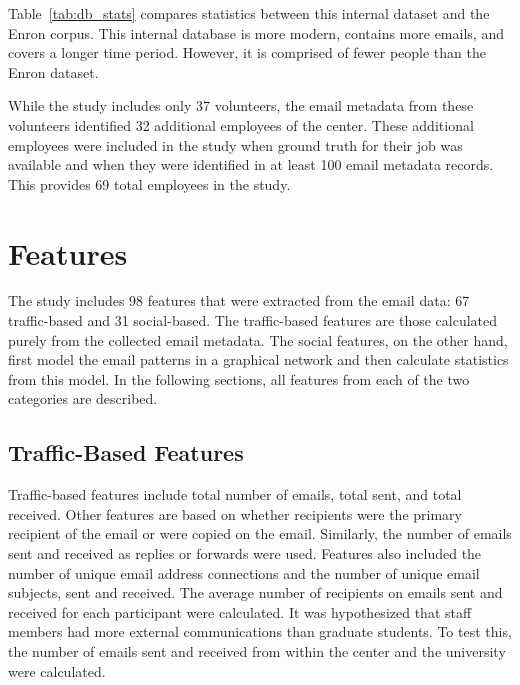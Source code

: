 \documentclass[10pt,twocolumn,conference]{IEEEtran}
\begin{document}
\begin{table}[t]
\centering
\caption{A comparison between the internal dataset and the Enron email corpus.}
\label{tab:db_stats}
\end{table}


Table~\ref{tab:db_stats} compares statistics between this internal dataset and the Enron corpus.  This internal database is more modern, contains more emails, and covers a longer time period.  However, it is comprised of fewer people than the Enron dataset.

While the study includes only 37 volunteers, the email metadata from these volunteers identified 32 additional employees of the center.  These additional employees were included in the study when ground truth for their job was available and when they were identified in at least 100 email metadata records.  This provides 69 total employees in the study.


\section{Features} \label{Features}
The study includes 98 features that were extracted from the email data: 67 traffic-based and 31 social-based.  The traffic-based features are those calculated purely from the collected email metadata.  The social features, on the other hand, first model the email patterns in a graphical network and then calculate statistics from this model.  In the following sections, all features from each of the two categories are described. 

\subsection{Traffic-Based Features}
Traffic-based features include total number of emails, total sent, and total received.  Other features are based on whether recipients were the primary recipient of the email or were copied on the email.  Similarly, the number of emails sent and received as replies or forwards were used.  Features also included the number of unique email address connections and the number of unique email subjects, sent and received.  The average number of recipients on emails sent and received for each participant were calculated.  It was hypothesized that staff members had more external communications than graduate students.  To test this, the number of emails sent and received from within the center and the university were calculated.  
\end{document}
